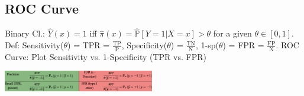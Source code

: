 \vspace{-5pt}

\subsection{ROC Curve}
Binary Cl.: $\hat{Y} (x) = 1$ iff $\hat{\pi}(x) = \hat{\mathbb{P}} [Y=1 | X=x] > \theta$ for a given $\theta \in [0,1]$.
Def: Sensitivity($\theta$) = TPR = $\mathrm{\frac{TP}{P}}$, Specificity($\theta$) = $\mathrm{\frac{TN}{N}}$, 1-sp($\theta$) = FPR = $\mathrm{\frac{FP}{N}}$.
ROC Curve: Plot Sensitivity vs. 1-Specificity (TPR vs. FPR)

\vspace{2pt}

\includegraphics[width=0.495\textwidth]{Bilder/ClassificationTable.png}


